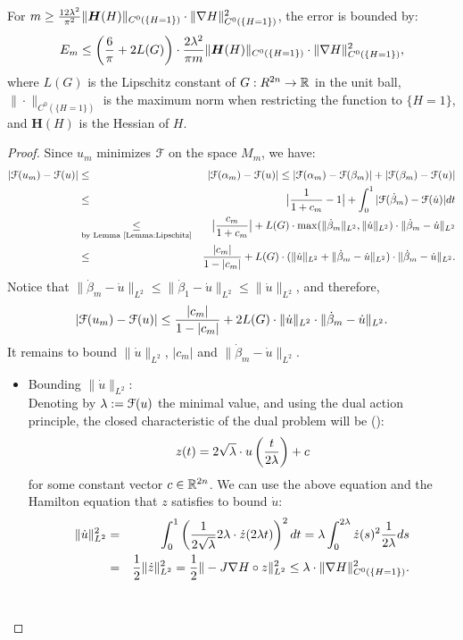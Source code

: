 \documentclass[../capacities_main.tex]{subfiles}
\begin{document}
\begin{Lemma}
	For  $m\geq\frac{12\lambda^2}{\pi^2 }\|\boldsymbol{H} (H)\|_{C^0(\{H=1\})}\cdot \|\nabla H\|^2_{C^0(\{H=1\})} $, the error is bounded by: 
	\begin{equation}\label{Lemma:error_bound}
	E_m\leq \left(\frac{6}{\pi}  +2 L(G)\right) \cdot \frac{2\lambda^2}{\pi m}\|\boldsymbol{H} (H)\|_{C^0(\{H=1\})}\cdot \|\nabla H\|^2_{C^0(\{H=1\})},
	\end{equation}
	where $L(G)$ is the Lipschitz constant of $G:R^{2n}\rightarrow{\mathbb R}$ in the unit ball, $\|\cdot\|_{C^0(\{H=1\})}$ is the maximum norm  when restricting the function to $\{H=1\}$, and $\boldsymbol{H} (H)$ is the Hessian of $H$.
\end{Lemma}
\begin{proof}
	Since $u_m$ minimizes ${\mathcal F}$ on the space $M_m$, we have:
	\begin{eqnarray*}
	|{\mathcal F}(u_m)-{\mathcal F}(u)|&\leq& |{\mathcal F}(\alpha_m)-{\mathcal F}(u)| \leq |{\mathcal F}(\alpha_m)-{\mathcal F}(\beta_m)|+|{\mathcal F}(\beta_m)-{\mathcal F}(u)|\\ 
	&\leq& \big|\frac{1}{1+c_m}-1\big| + \int_0^1 |{\mathcal F}(\dot \beta_m)-{\mathcal F}(\dot u)| dt\\
	&\underset{\text{by Lemma~\ref{Lemma:Lipschitz}}}{\leq}& \big|\frac{c_m}{1+c_m}\big| + L(G) \cdot \max(\|\dot \beta_m\|_{L^2},\|\dot u\|_{L^2})\cdot \|\dot \beta_m - \dot u\|_{L^2}\\
	&\leq&\frac{|c_m|}{1-|c_m|} + L(G) \cdot (\|\dot u\|_{L^2}+\|\dot \beta_m - \dot u\|_{L^2}) \cdot \|\dot \beta_m - \dot u\|_{L^2}.
	\end{eqnarray*}
	Notice that $\|\dot \beta_m - \dot u\|_{L^2}\leq \|\dot \beta_1 - \dot u\|_{L^2}\leq \|\dot u\|_{L^2}$, and therefore,
	\begin{equation}\label{eq:main_bound}
		|{\mathcal F}(u_m)-{\mathcal F}(u)|\leq \frac{|c_m|}{1-|c_m|} +2 L(G) \cdot \|\dot u\|_{L^2}\cdot \|\dot \beta_m - \dot u\|_{L^2}.
	\end{equation}
	It remains to bound $\|\dot u\|_{L^2}$, $|c_m|$ and $\|\dot\beta_m-\dot u\|_{L^2}$.
	\begin{itemize}
	\item Bounding {$\|\dot u\|_{L^2}$}:\\
		Denoting by $\lambda:={\mathcal F}(u)$ the minimal value, and using the dual action principle, the closed characteristic of the dual problem will be (\cite{going1998diss}):
		\[
		z(t)= 2\sqrt{\lambda} \cdot u\left(\frac{t}{2\lambda}\right) + c
		\]
		for some constant vector $c\in{\mathbb R}^{2n}$. We can use the above equation and the Hamilton equation that $z$ satisfies to bound $\dot u$:
		\begin{eqnarray*}
		\|\dot u\|_{L^2}^2 &=& \int_0^1 \left(\frac{1}{2\sqrt{\lambda}}2\lambda\cdot\dot 	z(2\lambda t)\right)^2 dt =\lambda\int_0^{2\lambda} \dot z(s)^2 \frac{1}{2\lambda}ds \\
		&=& \frac{1}{2}\|\dot z\|_{L^2}^2 = \frac{1}{2}\|-J\nabla H\circ z\|_{L^2}^2 \leq \lambda\cdot \|\nabla H\|_{C^0(\{H=1\})}^2. 
		\end{eqnarray*}\\
		

\end{itemize}
\end{proof}
\end{document}
